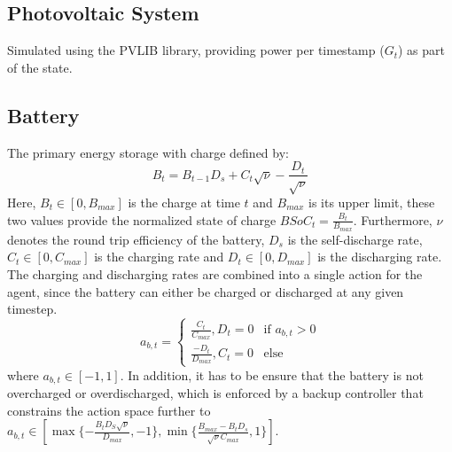 \documentclass{article}
\theoremstyle{plain}
\theoremstyle{definition}
\theoremstyle{remark}
\begin{document}
\subsection{Photovoltaic System}
Simulated using the PVLIB library, providing power per timestamp ($G_t$) as part of the state.

\subsection{Battery}
The primary energy storage with charge defined by:
\begin{equation}
    B_t = B_{t-1} D_s+ C_t \sqrt{\nu} - \frac{D_t}{\sqrt{\nu}}
\end{equation}
Here, $B_t \in [0, B_{max}]$ is the charge at time $t$ and $B_{max}$ is its upper limit, these two values provide the normalized state of charge $BSoC_t = \frac{B_t}{B_{max}}$. Furthermore, $\nu$ denotes the round trip efficiency of the battery, $D_s$ is the self-discharge rate, $C_t \in [0, C_{max}]$ is the charging rate and $D_t  \in [0, D_{max}]$ is the discharging rate. The charging and discharging rates are combined into a single action for the agent, since the battery can either be charged or discharged at any given timestep. 
\begin{equation}
    a_{b, t} = \begin{cases}
            \frac{C_t}{C_{max}}, D_t = 0 & \text{if } a_{b, t} > 0 \\
            \frac{-D_t}{D_{max}}, C_t = 0 & \text{else}
    \end{cases}
\end{equation}
where $a_{b, t} \in [-1 ,1]$. In addition, it has to be ensure that the battery is not overcharged or overdischarged, which is enforced by a backup controller that constrains the action space further to $a_{b, t} \in [\max\{-\frac{B_t D_S \sqrt{\nu}}{D_{max}}, -1 \}, \min \{\frac{B_{max} - B_t D_s}{\sqrt{\nu} C_{max}}, 1 \}]$.
\end{document}
